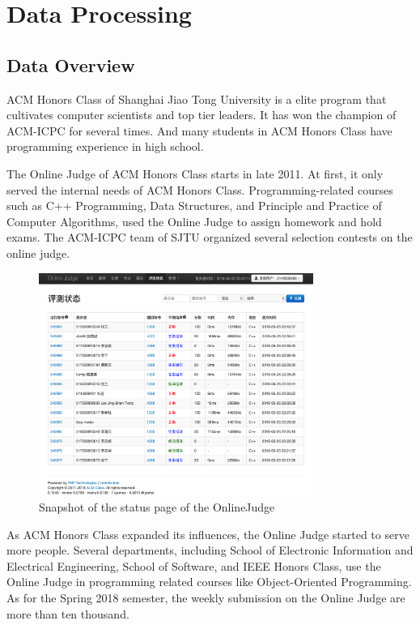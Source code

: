 
\chapter{Data Processing}


\section{Data Overview}

    ACM Honors Class\cite{acmclass} of Shanghai Jiao Tong University is a elite program
    that cultivates computer scientists and top tier leaders.
    It has won the champion of ACM-ICPC for several times.
    And many students in ACM Honors Class have programming experience in high school.

    The Online Judge\cite{acmoj} of ACM Honors Class starts in late 2011.
    At first, it only served the internal needs of ACM Honors Class.
    Programming-related courses such as C++ Programming, Data Structures,
    and Principle and Practice of Computer Algorithms,
    used the Online Judge to assign homework and hold exams.
    The ACM-ICPC team of SJTU organized several selection contests on the online judge.

    \begin{figure}[htp]
        \centering
        \includegraphics[width=0.8\textwidth]{img/acmoj.png}
        \caption{Snapshot of the status page of the OnlineJudge}
        \label{fig:acmoj}
    \end{figure}

    As ACM Honors Class expanded its influences, the Online Judge started to serve more people.
    Several departments, including School of Electronic Information and Electrical Engineering,
    School of Software, and IEEE Honors Class, use the Online Judge in programming related courses
    like Object-Oriented Programming.
    As for the Spring 2018 semester, the weekly submission on the Online Judge are more than ten thousand.

